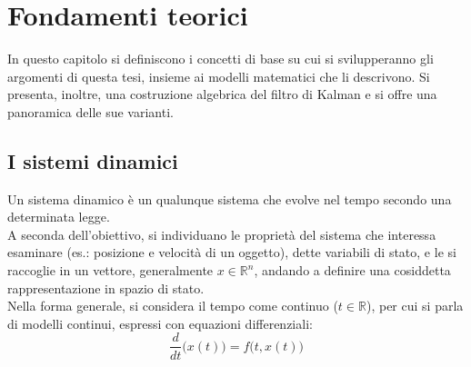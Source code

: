 \documentclass[12pt,a4paper,openright,twoside]{book}
\begin{document}

\chapter{Fondamenti teorici}

In questo capitolo si definiscono i concetti di base su cui si svilupperanno gli argomenti di questa tesi, insieme ai modelli matematici che li descrivono. Si presenta, inoltre, una costruzione algebrica del filtro di Kalman e si offre una panoramica delle sue varianti.

\section{I sistemi dinamici}

Un sistema dinamico è un qualunque sistema che evolve nel tempo secondo una determinata legge. \\

A seconda dell'obiettivo, si individuano le proprietà del sistema che interessa esaminare (es.: posizione e velocità di un oggetto), dette variabili di stato, e le si raccoglie in un vettore, generalmente $x\in\mathbb{R}^n$, andando a definire una cosiddetta rappresentazione in spazio di stato. \\
Nella forma generale, si considera il tempo come continuo ($t\in\mathbb{R}$), per cui si parla di modelli continui, espressi con equazioni differenziali:
$$\dfrac{d}{dt}\bigl(x(t)\bigr)=f\bigl(t,x(t)\bigr)$$ \pagebreak
\end{document}
